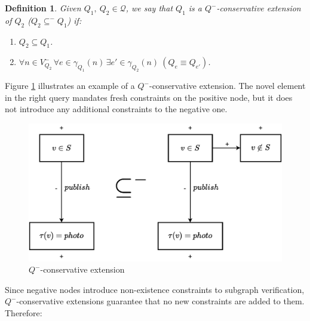 \documentclass[mathematics,article,submit,pdftex,moreauthors]{Definitions/mdpi}
\newtheorem{definition}{Definition}[section]
\begin{document}
\begin{definition}{}
    Given $Q_1,\ Q_2\in\mathcal{Q}$, we say that $Q_1$ is a \emph{$Q^-$-conservative extension} of $Q_2$ ($Q_2\subseteq^- Q_1$) if:
    \begin{enumerate}
        \item $Q_2\subseteq Q_1$.
        \item $\forall n\in V_{Q_2}^-\, \forall e\in \gamma_{Q_1}(n)\, \exists e'\in \gamma_{Q_2}(n)\ (Q_e\equiv Q_{e'})$.
    \end{enumerate}
\end{definition}\medskip

Figure \ref{ejemplo-conservativa} illustrates an example of a $Q^-$-conservative extension. The novel element in the right query mandates fresh constraints on the positive node, but it does not introduce any additional constraints to the negative one.

\begin{figure}[h]
    \begin{center}
        \includegraphics[scale=0.5]{png/FIG2.pdf}
    \end{center}
    \caption{%
        $Q^-$-conservative extension
    }%
    \label{ejemplo-conservativa}
\end{figure}

Since negative nodes introduce non-existence constraints to subgraph verification, $Q^-$-conservative extensions guarantee that no new constraints are added to them. Therefore:
\end{document}
